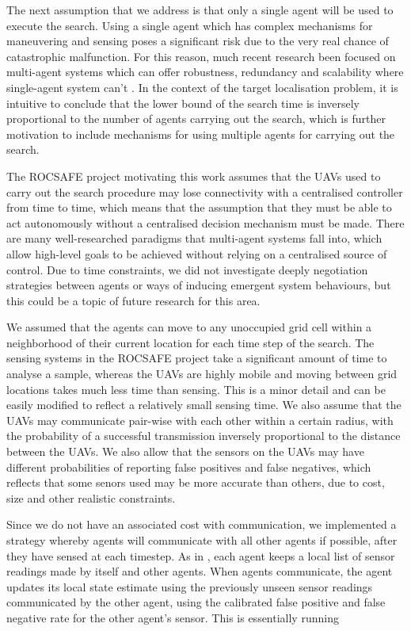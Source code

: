 The next assumption that we address is that only a single agent will be used to execute the search. Using a single agent which has complex mechanisms for maneuvering and sensing poses a significant risk due to the very real chance of catastrophic malfunction. For this reason, much recent research been focused on multi-agent systems which can offer robustness, redundancy and scalability where single-agent system can't \cite{Stone2000MultiagentPerspective}. In the context of the target localisation problem, it is intuitive to conclude that the lower bound of the search time is inversely proportional to the number of agents carrying out the search, which is further motivation to include mechanisms for using multiple agents for carrying out the search.

The ROCSAFE project \cite{rocsafeNUIG} motivating this work assumes that the UAVs used to carry out the search procedure may lose connectivity with a centralised controller from time to time, which means that the assumption that they must be able to act autonomously without a centralised decision mechanism must be made. There are many well-researched paradigms that multi-agent systems fall into, which allow high-level goals to be achieved without relying on a centralised source of control. Due to time constraints, we did not investigate deeply negotiation strategies between agents or ways of inducing emergent system behaviours, but this could be a topic of future research for this area.\par
We assumed that the agents can move to any unoccupied grid cell within a neighborhood of their current location for each time step of the search. The sensing systems in the ROCSAFE project take a significant amount of time to analyse a sample, whereas the UAVs are highly mobile and moving between grid locations takes much less time than sensing. This is a minor detail and can be easily modified to reflect a relatively small sensing time. We also assume that the UAVs may communicate pair-wise with each other within a certain radius, with the probability of a successful transmission inversely proportional to the distance between the UAVs. We also allow that the sensors on the UAVs may have different probabilities of reporting false positives and false negatives, which reflects that some senors used may be more accurate than others, due to cost, size and other realistic constraints. \par

Since we do not have an associated cost with communication, we implemented a strategy whereby agents will communicate with all other agents if possible, after they have sensed at each timestep. As in \cite{Waharte2009CoordinatedUAVs}, each agent keeps a local list of sensor readings made by itself and other agents. When agents communicate, the agent updates its local state estimate using the previously unseen sensor readings communicated by the other agent, using the calibrated false positive and false negative rate for the other agent's sensor. This is essentially running 